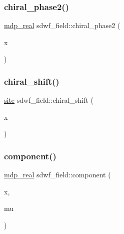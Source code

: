 \mbox{\label{classsdwf__field_a67fe2a75323e3dcfce3675cce0bbb312}} 
\subsubsection{\texorpdfstring{chiral\+\_\+phase2()}{chiral\_phase2()}}
{\footnotesize\ttfamily \hyperlink{mdp__global__vars_8h_a69d96b74c791e0bbdb888b3913a69450}{mdp\+\_\+real} sdwf\+\_\+field\+::chiral\+\_\+phase2 (\begin{DoxyParamCaption}\item[{\hyperlink{mdp__compatibility__macros_8h_aa6f1179c424e48adef1cedf7c436eb75}{site}}]{x }\end{DoxyParamCaption})\hspace{0.3cm}{\ttfamily [inline]}}

\mbox{\label{classsdwf__field_a5cff8766c1891c6240c97d17c6bb63b9}} 
\subsubsection{\texorpdfstring{chiral\+\_\+shift()}{chiral\_shift()}}
{\footnotesize\ttfamily \hyperlink{mdp__compatibility__macros_8h_aa6f1179c424e48adef1cedf7c436eb75}{site} sdwf\+\_\+field\+::chiral\+\_\+shift (\begin{DoxyParamCaption}\item[{\hyperlink{mdp__compatibility__macros_8h_aa6f1179c424e48adef1cedf7c436eb75}{site}}]{x }\end{DoxyParamCaption})\hspace{0.3cm}{\ttfamily [inline]}}

\mbox{\label{classsdwf__field_aa834c736322bef716cd0e31a391623d3}} 
\subsubsection{\texorpdfstring{component()}{component()}}
{\footnotesize\ttfamily \hyperlink{mdp__global__vars_8h_a69d96b74c791e0bbdb888b3913a69450}{mdp\+\_\+real} sdwf\+\_\+field\+::component (\begin{DoxyParamCaption}\item[{\hyperlink{mdp__compatibility__macros_8h_aa6f1179c424e48adef1cedf7c436eb75}{site}}]{x,  }\item[{int}]{mu }\end{DoxyParamCaption})\hspace{0.3cm}{\ttfamily [inline]}}

